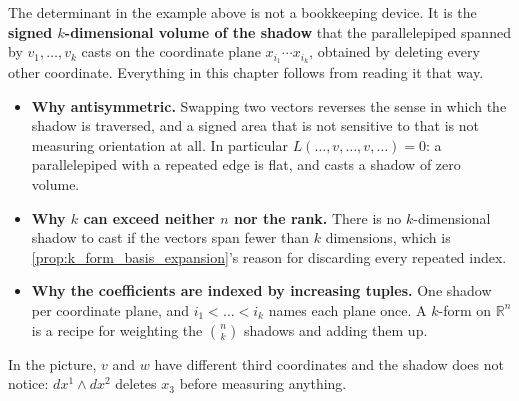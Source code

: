 \begin{importantremark}
\label{rem:forms_measure_shadows}
The determinant in the example above is not a bookkeeping device. It is the \textbf{signed
$k$-dimensional volume of the shadow} that the parallelepiped spanned by $v_1,\dots,v_k$ casts
on the coordinate plane $x_{i_1}\cdots x_{i_k}$, obtained by deleting every other coordinate.
Everything in this chapter follows from reading it that way.
\begin{itemize}
  \item \textbf{Why antisymmetric.} Swapping two vectors reverses the sense in which the shadow
    is traversed, and a signed area that is not sensitive to that is not measuring orientation
    at all. In particular $L(\dots,v,\dots,v,\dots) = 0$: a parallelepiped with a repeated edge
    is flat, and casts a shadow of zero volume.
  \item \textbf{Why $k$ can exceed neither $n$ nor the rank.} There is no $k$-dimensional
    shadow to cast if the vectors span fewer than $k$ dimensions, which is
    \cref{prop:k_form_basis_expansion}'s reason for discarding every repeated index.
  \item \textbf{Why the coefficients are indexed by increasing tuples.} One shadow per
    coordinate plane, and $i_1 < \dots < i_k$ names each plane once. A $k$-form on
    $\mathbb{R}^n$ is a recipe for weighting the $\binom{n}{k}$ shadows and adding them up.
\end{itemize}
In the picture, $v$ and $w$ have different third coordinates and the shadow does not notice:
$dx^1\wedge dx^2$ deletes $x_3$ before measuring anything.
\end{importantremark}

